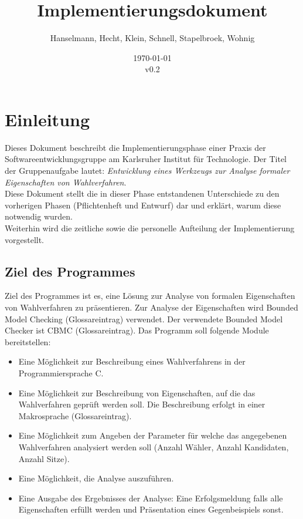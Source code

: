 \documentclass[a4paper]{scrreprt}
\begin{document}
\title{Implementierungsdokument}
\author{Hanselmann, Hecht, Klein, Schnell, Stapelbroek, Wohnig}
\date{\today\\v0.2}
\maketitle 
\tableofcontents	
\listoffigures


\chapter{Einleitung}
Dieses Dokument beschreibt die Implementierungsphase einer Praxis der Softwareentwicklungsgruppe am Karlsruher Institut für Technologie. Der Titel der Gruppenaufgabe lautet: \textit{Entwicklung eines Werkzeugs zur Analyse formaler Eigenschaften von Wahlverfahren}. \\
Diese Dokument stellt die in dieser Phase entstandenen Unterschiede zu den vorherigen Phasen (Pflichtenheft und Entwurf) dar und erklärt, warum diese notwendig wurden. \\
Weiterhin wird die zeitliche sowie die personelle Aufteilung der Implementierung vorgestellt. \\
\section{Ziel des Programmes}
Ziel des Programmes ist es, eine Lösung zur Analyse von formalen Eigenschaften von Wahlverfahren zu präsentieren. Zur Analyse der Eigenschaften wird Bounded Model Checking (Glossareintrag) verwendet. Der verwendete Bounded Model Checker ist CBMC (Glossareintrag). Das Programm soll folgende Module bereitstellen: 
\begin{itemize}
\item Eine Möglichkeit zur Beschreibung eines Wahlverfahrens in der Programmiersprache C. 
\item Eine Möglichkeit zur Beschreibung von Eigenschaften, auf die das Wahlverfahren geprüft werden soll. Die Beschreibung erfolgt in einer Makrosprache (Glossareintrag).
\item Eine Möglichkeit zum Angeben der Parameter für welche das angegebenen Wahlverfahren analysiert werden soll (Anzahl Wähler, Anzahl Kandidaten, Anzahl Sitze). 
\item Eine Möglichkeit, die Analyse auszuführen.
\item Eine Ausgabe des Ergebnisses der Analyse: Eine Erfolgsmeldung falls alle Eigenschaften erfüllt werden und Präsentation eines Gegenbeispiels sonst.
\end{itemize}
\end{document}
